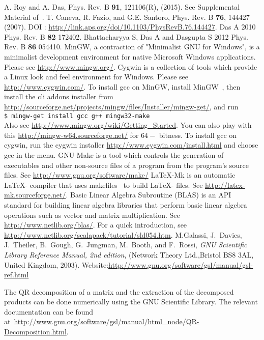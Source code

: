 \documentclass[a4paper,10pt]{article}
\newcommand{\shellcmd}[1]{\\\indent\indent\texttt{\footnotesize\$ #1}\\}
\begin{document}
\begin{thebibliography}{10}
\newblock A. Roy and A. Das, Phys. Rev. B {\bf 91}, 121106(R), (2015).
See Supplemental Material of~\cite{myisingrand}.
\newblock T. Caneva, R. Fazio, and G.E. Santoro, Phys. Rev. B {\bf 76}, 144427 (2007).
\newblock DOI : \url{http://link.aps.org/doi/10.1103/PhysRevB.76.144427}.
 Das A 2010 {Phys. Rev. B} {\bf 82} 172402. Bhattacharyya S, Das A
and Dasgupta S 2012 {Phys. Rev. B} {\bf 86} 054410.
MinGW, a contraction of "Minimalist GNU for Windows", is a minimalist development environment for native Microsoft Windows applications.
Please see \url{http://www.mingw.org/}.
Cygwin is a collection of tools which provide a Linux look and feel environment for Windows. Please see \url{http://www.cygwin.com/}.
\newblock To install gcc on MinGW, install MinGW~\cite{mingw}, then install the cli addons installer from \url{http://sourceforge.net/projects/mingw/files/Installer/mingw-get/}, and run
\shellcmd{mingw-get install gcc g++ mingw32-make}
Also see \url{http://www.mingw.org/wiki/Getting_Started}. You can also play with this \url{http://mingw-w64.sourceforge.net/} for $64-$ bitness.
\newblock To install gcc on cygwin, run the cygwin installer \url{http://www.cygwin.com/install.html} and choose gcc in the menu. 
GNU Make is a tool which controls the generation of executables and other non-source files of a program from the program's source files. See
\url{http://www.gnu.org/software/make/}
LaTeX-Mk is an automatic \LaTeX - compiler that uses makefiles~\cite{make} to build \LaTeX - files. See \url{http://latex-mk.sourceforge.net/}.
Basic Linear Algebra Subroutine (BLAS) is an API standard for building linear algebra libraries that perform basic linear algebra operations such as vector and matrix multiplication. See \url{http://www.netlib.org/blas/}. For a quick introduction, see \url{http://www.netlib.org/scalapack/tutorial/sld054.htm}.
M.Galassi, J.~Davies, J.~Theiler, B.~Gough, G.~Jungman, M.~Booth, and F.~Rossi, 
{\em GNU Scientific Library Reference Manual,  2nd edition},
(Network Theory Ltd.,Bristol BS8 3AL, United Kingdom, 2003).
\newblock Website:\url{http://www.gnu.org/software/gsl/manual/gsl-ref.html}

The QR decomposition of a matrix and the extraction of the decomposed products can be done numerically using the GNU Scientific Library. The relevant documentation can be found at~\url{http://www.gnu.org/software/gsl/manual/html_node/QR-Decomposition.html}.



\end{thebibliography}
\end{document}
